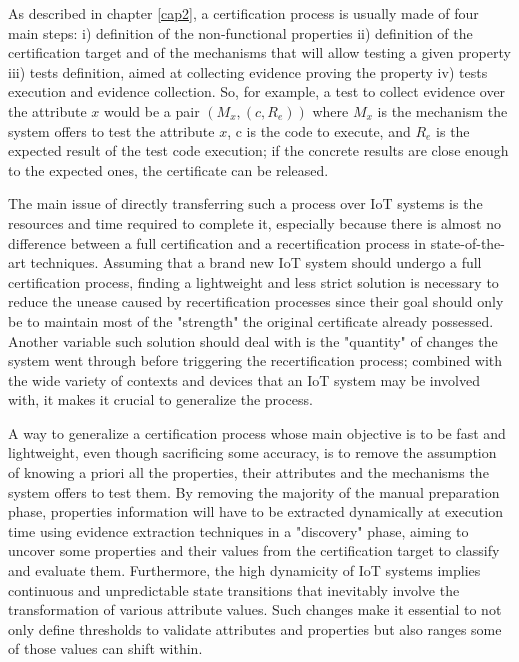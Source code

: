 As described in chapter \ref{cap2}, a certification process is usually made of four main steps: i) definition of the non-functional properties ii) definition of the certification target and of the mechanisms that will allow testing a given property iii) tests definition, aimed at collecting evidence proving the property iv) tests execution and evidence collection. So, for example, a test to collect evidence over the attribute \(x\) would be a pair \( (M_x, (c, R_e) ) \) where \(M_x\) is the mechanism the system offers to test the attribute \(x\), c is the code to execute, and \(R_e\) is the expected result of the test code execution; if the concrete results are close enough to the expected ones, the certificate can be released.

The main issue of directly transferring such a process over IoT systems is the resources and time required to complete it, especially because there is almost no difference between a full certification and a recertification process in state-of-the-art techniques. Assuming that a brand new IoT system should undergo a full certification process, finding a lightweight and less strict solution is necessary to reduce the unease caused by recertification processes since their goal should only be to maintain most of the "strength" the original certificate already possessed. Another variable such solution should deal with is the "quantity" of changes the system went through before triggering the recertification process; combined with the wide variety of contexts and devices that an IoT system may be involved with, it makes it crucial to generalize the process.

A way to generalize a certification process whose main objective is to be fast and lightweight, even though sacrificing some accuracy, is to remove the assumption of knowing a priori all the properties, their attributes and the mechanisms the system offers to test them. By removing the majority of the manual preparation phase, properties information will have to be extracted dynamically at execution time using evidence extraction techniques in a "discovery" phase, aiming to uncover some properties and their values from the certification target to classify and evaluate them. Furthermore, the high dynamicity of IoT systems implies continuous and unpredictable state transitions that inevitably involve the transformation of various attribute values. Such changes make it essential to not only define thresholds to validate attributes and properties but also ranges some of those values can shift within.

